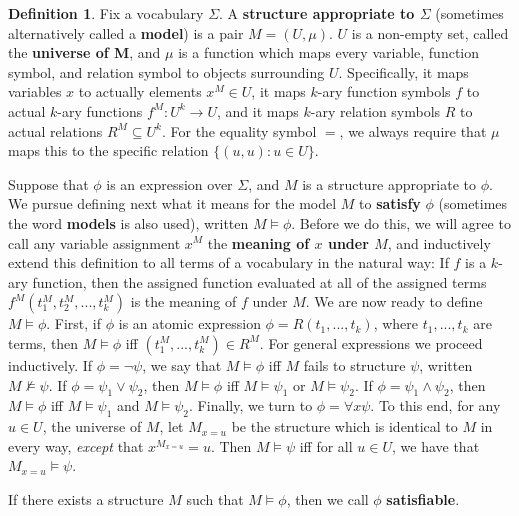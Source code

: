 \documentclass{article}
\theoremstyle{definition}
\newtheorem{definition}{Definition}[section]
\theoremstyle{plain}
\theoremstyle{theorem}
\begin{document}
\begin{definition}
    Fix a vocabulary $\Sigma$. A \textbf{structure appropriate to $\Sigma$} (sometimes alternatively called a \textbf{model}) is a pair $M=(U,\mu)$. $U$ is a non-empty set, called the \textbf{universe of M}, and $\mu$ is a function which maps every variable, function symbol, and relation symbol to objects surrounding $U$. Specifically, it maps variables $x$ to actually elements $x^M \in U$, it maps $k$-ary function symbols $f$ to actual $k$-ary functions $f^M:U^k \to U$, and it maps $k$-ary relation symbols $R$ to actual relations $R^M \subseteq U^k$. For the equality symbol $=$, we always require that $\mu$ maps this to the specific relation $\{(u,u): u \in U\}$. 
    \par Suppose that $\phi$ is an expression over $\Sigma$, and $M$ is a structure appropriate to $\phi$. We pursue defining next what it means for the model $M$ to \textbf{satisfy} $\phi$ (sometimes the word \textbf{models} is also used), written $M \models \phi$. Before we do this, we will agree to call any variable assignment $x^M$ the \textbf{meaning of $x$ under $M$}, and inductively extend this definition to all terms of a vocabulary in the natural way: If $f$ is a $k$-ary function, then the assigned function evaluated at all of the assigned terms $f^M(t_1^M,t_2^M,...,t_k^M)$ is the meaning of $f$ under $M$. We are now ready to define $M \models \phi$. First, if $\phi$ is an atomic expression $\phi = R(t_1,...,t_k)$, where $t_1,...,t_k$ are terms, then $M \models \phi$ iff $(t_1^M,...,t_k^M) \in R^M$. For general expressions we proceed inductively. If $\phi = \neg \psi$, we say that $M \models \phi$ iff $M$ fails to structure $\psi$, written $M \nvDash \psi$. If $\phi = \psi_1 \vee \psi_2$, then $M \models \phi$ iff $M \models \psi_1$ or $M \models \psi_2$. If $\phi = \psi_1 \wedge \psi_2$, then $M \models \phi$ iff $M \models \psi_1$ and $M \models \psi_2$. Finally, we turn to $\phi = \forall x \psi$. To this end, for any $u \in U$, the universe of $M$, let $M_{x=u}$ be the structure which is identical to $M$ in every way, \textit{except} that $x^{M_{x=u}} = u$. Then $M \models \psi$ iff for all $u \in U$, we have that $M_{x=u} \models \psi$. 
    \par If there exists a structure $M$ such that $M \models \phi$, then we call $\phi$ \textbf{satisfiable}.
\end{definition}
\end{document}
